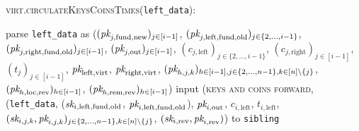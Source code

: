 \begin{center}
  \begin{processbox}{\textsc{virt}.\textsc{circulateKeysCoinsTimes}(\texttt{left\_data}):}
    \begin{algorithmic}[1]
       
        \State parse \texttt{left\_data} as ($(\textit{pk}_{j, \mathrm{fund},
        \mathrm{new}})_{j \in [i-1]}$, $(\textit{pk}_{j, \mathrm{left}, \mathrm{fund},
        \mathrm{old}})_{j \in \{2, \dots, i-1\}}$, $(\textit{pk}_{j, \mathrm{right},
        \mathrm{fund}, \mathrm{old}})_{j \in [i-1]}$, $(\textit{pk}_{j, \mathrm{out}})_{j
        \in [i-1]}$, $(c_{j, \mathrm{left}})_{j \in \{2, \dots, i-1\}}$, $(c_{j,
        \mathrm{right}})_{j \in [i-1]}$, $(t_j)_{j \in [i-1]}$,
        $\textit{pk}_{\mathrm{left}, \mathrm{virt}}$, $\textit{pk}_{\mathrm{right},
        \mathrm{virt}}$, $(\textit{pk}_{h, j, k})_{h \in [i-1], j \in \{2, \dots, n-1\},
        k \in [n] \setminus \{j\}}$, $(\textit{pk}_{h, \mathrm{loc}, \mathrm{rev}})_{h
        \in [i-1]}$, $(\textit{pk}_{h, \mathrm{rem}, \mathrm{rev}})_{h \in [i-1]}$)
         
          \State input (\textsc{keys and coins forward}, (\texttt{left\_data},
          ($\textit{sk}_{i, \mathrm{left}, \mathrm{fund}, \mathrm{old}}$, $\textit{pk}_{i,
          \mathrm{left}, \mathrm{fund}, \mathrm{old}}$), $\textit{pk}_{i, \mathrm{out}}$,
          $c_{i, \mathrm{left}}$, $t_{i, \mathrm{left}}$, $(\textit{sk}_{i, j, k}, \textit{pk}_{i,
          j, k})_{j \in \{2, \dots, n-1\}, k \in [n] \setminus \{j\}}$,
          $(\textit{sk}_{i, \mathrm{rev}}, \textit{pk}_{i, \mathrm{rev}})$) to \texttt{sibling}
          \State {}
          \State {}
\end{algorithmic}
\end{processbox}
\end{center}
